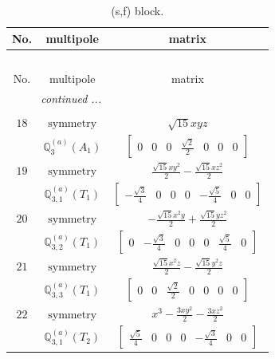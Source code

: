 \documentclass[fleqn,8pt,landscape]{jsarticle}
\begin{document}
\begin{longtable}{ccc}
\caption{(s,f) block.}
 \\
 \hline \hline
No. & multipole & matrix \\ \hline \endfirsthead

\multicolumn{2}{l}{\tablename\ \thetable{}} \\
 \hline \hline
No. & multipole & matrix \\ \hline \endhead

 \hline \hline
\multicolumn{2}{r}{\footnotesize\it continued ...} \\ \endfoot

 \hline \hline
\multicolumn{2}{r}{} \\ \endlastfoot

$ 18 $ & $ \text{symmetry} $ & $ \sqrt{15} x y z $ \\
$  $ & $ \mathbb{Q}_{3}^{(a)}(A_{1}) $ & $ \begin{bmatrix} 0 & 0 & 0 & \frac{\sqrt{2}}{2} & 0 & 0 & 0 \end{bmatrix} $ \\ \hline
$ 19 $ & $ \text{symmetry} $ & $ \frac{\sqrt{15} x y^{2}}{2} - \frac{\sqrt{15} x z^{2}}{2} $ \\
$  $ & $ \mathbb{Q}_{3,1}^{(a)}(T_{1}) $ & $ \begin{bmatrix} - \frac{\sqrt{3}}{4} & 0 & 0 & 0 & - \frac{\sqrt{5}}{4} & 0 & 0 \end{bmatrix} $ \\ \hline
$ 20 $ & $ \text{symmetry} $ & $ - \frac{\sqrt{15} x^{2} y}{2} + \frac{\sqrt{15} y z^{2}}{2} $ \\
$  $ & $ \mathbb{Q}_{3,2}^{(a)}(T_{1}) $ & $ \begin{bmatrix} 0 & - \frac{\sqrt{3}}{4} & 0 & 0 & 0 & \frac{\sqrt{5}}{4} & 0 \end{bmatrix} $ \\ \hline
$ 21 $ & $ \text{symmetry} $ & $ \frac{\sqrt{15} x^{2} z}{2} - \frac{\sqrt{15} y^{2} z}{2} $ \\
$  $ & $ \mathbb{Q}_{3,3}^{(a)}(T_{1}) $ & $ \begin{bmatrix} 0 & 0 & \frac{\sqrt{2}}{2} & 0 & 0 & 0 & 0 \end{bmatrix} $ \\ \hline
$ 22 $ & $ \text{symmetry} $ & $ x^{3} - \frac{3 x y^{2}}{2} - \frac{3 x z^{2}}{2} $ \\
$  $ & $ \mathbb{Q}_{3,1}^{(a)}(T_{2}) $ & $ \begin{bmatrix} \frac{\sqrt{5}}{4} & 0 & 0 & 0 & - \frac{\sqrt{3}}{4} & 0 & 0 \end{bmatrix} $ \\ \hline

\end{longtable}
\end{document}
